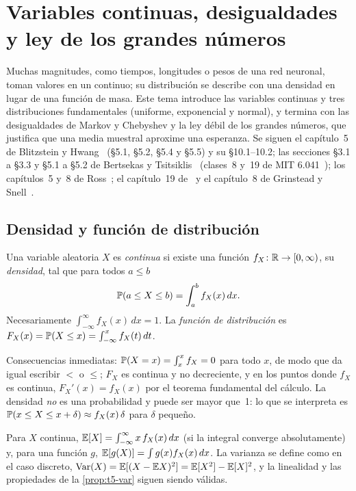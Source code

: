 \chapter{Variables continuas, desigualdades y ley de los grandes números}
\label{tema:6}

Muchas magnitudes, como tiempos, longitudes o pesos de una red neuronal, toman valores en un continuo; su distribución se describe con una densidad en lugar de una función de masa. Este tema introduce las variables continuas y tres distribuciones fundamentales (uniforme, exponencial y normal), y termina con las desigualdades de Markov y Chebyshev y la ley débil de los grandes números, que justifica que una media muestral aproxime una esperanza. Se siguen el capítulo~5 de Blitzstein y Hwang~\cite{bh} (§5.1, §5.2, §5.4 y §5.5) y su §10.1--10.2; las secciones §3.1 a §3.3 y §5.1 a §5.2 de Bertsekas y Tsitsiklis~\cite{bt} (clases~8 y~19 de MIT 6.041~\cite{mit6041f10}); los capítulos~5 y~8 de Ross~\cite{ross}; el capítulo~19 de~\cite{mcs} y el capítulo~8 de Grinstead y Snell~\cite{gs}.

\section{Densidad y función de distribución}

\begin{definicion}
Una variable aleatoria $X$ es \emph{continua} si existe una función $f_X\colon\mathbb{R}\to[0,\infty)$, su \emph{densidad}, tal que para todos $a\le b$
\[
\mathbb{P}(a\le X\le b)=\int_a^bf_X(x)\,dx.
\]
Necesariamente $\int_{-\infty}^{\infty}f_X(x)\,dx=1$. La \emph{función de distribución} es $F_X(x)=\mathbb{P}(X\le x)=\int_{-\infty}^{x}f_X(t)\,dt$.
\end{definicion}

Consecuencias inmediatas: $\mathbb{P}(X=x)=\int_x^xf_X=0$ para todo $x$, de modo que da igual escribir $<$ o $\le$; $F_X$ es continua y no decreciente, y en los puntos donde $f_X$ es continua, $F_X'(x)=f_X(x)$ por el teorema fundamental del cálculo. La densidad \emph{no} es una probabilidad y puede ser mayor que~1: lo que se interpreta es $\mathbb{P}(x\le X\le x+\delta)\approx f_X(x)\,\delta$ para $\delta$ pequeño.

\begin{definicion}
Para $X$ continua, $\mathbb{E}[X]=\int_{-\infty}^{\infty}x\,f_X(x)\,dx$ (si la integral converge absolutamente) y, para una función $g$, $\mathbb{E}[g(X)]=\int g(x)f_X(x)\,dx$. La varianza se define como en el caso discreto, $\operatorname{Var}(X)=\mathbb{E}[(X-\mathbb{E} X)^{2}]=\mathbb{E}[X^{2}]-\mathbb{E}[X]^{2}$, y la linealidad y las propiedades de la \cref{prop:t5-var} siguen siendo válidas.
\end{definicion}


